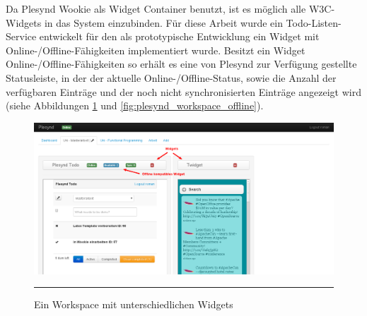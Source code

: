 Da Plesynd Wookie als Widget Container benutzt, ist es möglich alle W3C-Widgets in das System einzubinden. Für diese Arbeit wurde ein Todo-Listen-Service entwickelt für den als prototypische Entwicklung ein Widget mit Online-/Offline-Fähigkeiten implementiert wurde. Besitzt ein Widget Online-/Offline-Fähigkeiten so erhält es eine von Plesynd zur Verfügung gestellte Statusleiste, in der der aktuelle Online-/Offline-Status, sowie die Anzahl der verfügbaren Einträge und der noch nicht synchronisierten Einträge angezeigt wird (siehe Abbildungen \ref{fig:plesynd_workspace_online} und \ref{fig:plesynd_workspace_offline}).
\begin{figure}
  \centering
  \includegraphics[width=\textwidth,height=\textheight,keepaspectratio]{./Figures/plesynd_workspace_online.png}
    \rule{35em}{0.5pt}
  \caption[Plesynd User-Interface: Workspace Online]{Ein Workspace mit unterschiedlichen Widgets}
  \label{fig:plesynd_workspace_online}
\end{figure}

